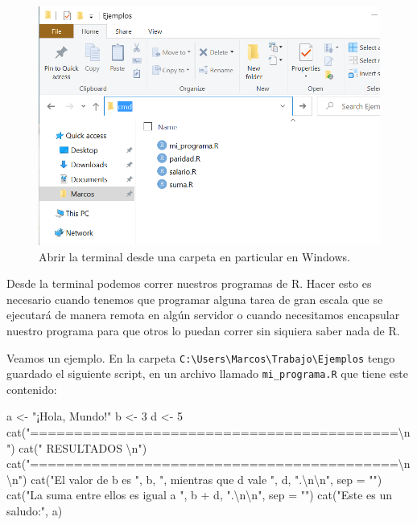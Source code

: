 \documentclass[
]{book}
\newenvironment{Shaded}{\begin{snugshade}}{\end{snugshade}}
\newcommand{\AttributeTok}[1]{\textcolor[rgb]{0.77,0.63,0.00}{#1}}
\newcommand{\DecValTok}[1]{\textcolor[rgb]{0.00,0.00,0.81}{#1}}
\newcommand{\FunctionTok}[1]{\textcolor[rgb]{0.00,0.00,0.00}{#1}}
\newcommand{\NormalTok}[1]{#1}
\newcommand{\OtherTok}[1]{\textcolor[rgb]{0.56,0.35,0.01}{#1}}
\newcommand{\SpecialCharTok}[1]{\textcolor[rgb]{0.00,0.00,0.00}{#1}}
\newcommand{\StringTok}[1]{\textcolor[rgb]{0.31,0.60,0.02}{#1}}
\begin{document}
\begin{figure}

{\centering \includegraphics[width=0.8\linewidth]{images/07_otros/terminal6} 

}

\caption{Abrir la terminal desde una carpeta en particular en Windows.}\label{fig:unnamed-chunk-111}
\end{figure}

Desde la terminal podemos correr nuestros programas de R. Hacer esto es necesario cuando tenemos que programar alguna tarea de gran escala que se ejecutará de manera remota en algún servidor o cuando necesitamos encapsular nuestro programa para que otros lo puedan correr sin siquiera saber nada de R.

Veamos un ejemplo. En la carpeta \texttt{C:\textbackslash{}Users\textbackslash{}Marcos\textbackslash{}Trabajo\textbackslash{}Ejemplos} tengo guardado el siguiente script, en un archivo llamado \texttt{mi\_programa.R} que tiene este contenido:

\begin{Shaded}
\begin{Highlighting}[]
\NormalTok{a }\OtherTok{\textless{}{-}} \StringTok{"¡Hola, Mundo!"}
\NormalTok{b }\OtherTok{\textless{}{-}} \DecValTok{3}
\NormalTok{d }\OtherTok{\textless{}{-}} \DecValTok{5}
\FunctionTok{cat}\NormalTok{(}\StringTok{"==========================================}\SpecialCharTok{\textbackslash{}n}\StringTok{"}\NormalTok{)}
\FunctionTok{cat}\NormalTok{(}\StringTok{"                 RESULTADOS               }\SpecialCharTok{\textbackslash{}n}\StringTok{"}\NormalTok{)}
\FunctionTok{cat}\NormalTok{(}\StringTok{"==========================================}\SpecialCharTok{\textbackslash{}n\textbackslash{}n}\StringTok{"}\NormalTok{)}
\FunctionTok{cat}\NormalTok{(}\StringTok{"El valor de b es "}\NormalTok{, b, }\StringTok{", mientras que d vale "}\NormalTok{, d, }\StringTok{".}\SpecialCharTok{\textbackslash{}n\textbackslash{}n}\StringTok{"}\NormalTok{, }\AttributeTok{sep =} \StringTok{""}\NormalTok{)}
\FunctionTok{cat}\NormalTok{(}\StringTok{"La suma entre ellos es igual a "}\NormalTok{, b }\SpecialCharTok{+}\NormalTok{ d, }\StringTok{".}\SpecialCharTok{\textbackslash{}n\textbackslash{}n}\StringTok{"}\NormalTok{, }\AttributeTok{sep =} \StringTok{""}\NormalTok{)}
\FunctionTok{cat}\NormalTok{(}\StringTok{"Este es un saludo:"}\NormalTok{, a)}
\end{Highlighting}
\end{Shaded}
\end{document}
